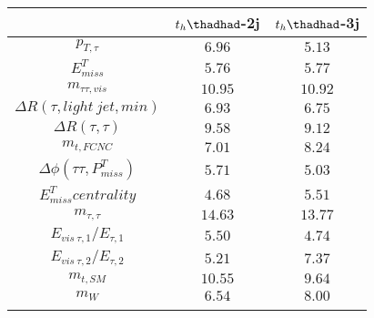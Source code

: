\centering
\begin{tabular}{ccc} \toprule\toprule
 & $t_h\thadhad$-2j & $t_h\thadhad$-3j\\\midrule
$p_{T,\tau }$ & $6.96$ & $5.13$\\
$E^{T}_{miss}$ & $5.76$ & $5.77$\\
$m_{\tau \tau ,vis}$ & $10.95$ & $10.92$\\
$\Delta R(\tau ,light~jet,min)$ & $6.93$ & $6.75$\\
$\Delta R(\tau ,\tau )$ & $9.58$ & $9.12$\\
$m_{t,FCNC}$ & $7.01$ & $8.24$\\
$\Delta\phi(\tau \tau ,P^{T}_{miss})$ & $5.71$ & $5.03$\\
$E^{T}_{miss} centrality$ & $4.68$ & $5.51$\\
$m_{\tau ,\tau }$ & $14.63$ & $13.77$\\
$E_{vis~\tau ,1}/E_{\tau ,1}$ & $5.50$ & $4.74$\\
$E_{vis~\tau ,2}/E_{\tau ,2}$ & $5.21$ & $7.37$\\
$m_{t,SM}$ & $10.55$ & $9.64$\\
$m_{W}$ & $6.54$ & $8.00$\\
\bottomrule\bottomrule\\
\end{tabular}
